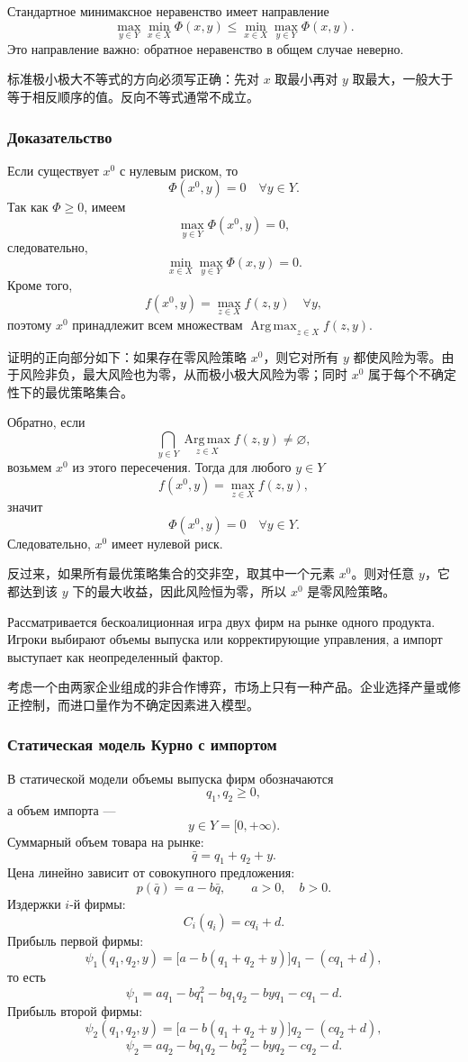 \documentclass[12pt,a4paper]{article}
\newcommand{\Argmax}{\operatorname*{Arg\,max}}
\newcommand{\zh}[1]{\par\noindent #1\par}
\begin{document}
Стандартное минимаксное неравенство имеет направление
\[
\max_{y\in Y}\min_{x\in X}\Phi(x,y)\le
\min_{x\in X}\max_{y\in Y}\Phi(x,y).
\]
Это направление важно: обратное неравенство в общем случае неверно.

\zh{标准极小极大不等式的方向必须写正确：先对 $x$ 取最小再对 $y$ 取最大，一般大于等于相反顺序的值。反向不等式通常不成立。}

\subsubsection{Доказательство}
Если существует $x^0$ с нулевым риском, то
\[
\Phi(x^0,y)=0\quad \forall y\in Y.
\]
Так как $\Phi\ge 0$, имеем
\[
\max_{y\in Y}\Phi(x^0,y)=0,
\]
следовательно,
\[
\min_{x\in X}\max_{y\in Y}\Phi(x,y)=0.
\]
Кроме того,
\[
f(x^0,y)=\max_{z\in X}f(z,y)\quad \forall y,
\]
поэтому $x^0$ принадлежит всем множествам $\Argmax_{z\in X}f(z,y)$.

\zh{证明的正向部分如下：如果存在零风险策略 $x^0$，则它对所有 $y$ 都使风险为零。由于风险非负，最大风险也为零，从而极小极大风险为零；同时 $x^0$ 属于每个不确定性下的最优策略集合。}

Обратно, если
\[
\bigcap_{y\in Y}\Argmax_{z\in X}f(z,y)\ne\varnothing,
\]
возьмем $x^0$ из этого пересечения. Тогда для любого $y\in Y$
\[
f(x^0,y)=\max_{z\in X}f(z,y),
\]
значит
\[
\Phi(x^0,y)=0\quad \forall y\in Y.
\]
Следовательно, $x^0$ имеет нулевой риск.

\zh{反过来，如果所有最优策略集合的交非空，取其中一个元素 $x^0$。则对任意 $y$，它都达到该 $y$ 下的最大收益，因此风险恒为零，所以 $x^0$ 是零风险策略。}

\newpage
{}


Рассматривается бескоалиционная игра двух фирм на рынке одного продукта. Игроки выбирают объемы выпуска или корректирующие управления, а импорт выступает как неопределенный фактор.

\zh{考虑一个由两家企业组成的非合作博弈，市场上只有一种产品。企业选择产量或修正控制，而进口量作为不确定因素进入模型。}

\subsubsection{Статическая модель Курно с импортом}
В статической модели объемы выпуска фирм обозначаются
\[
q_1,q_2\ge 0,
\]
а объем импорта ---
\[
y\in Y=[0,+\infty).
\]
Суммарный объем товара на рынке:
\[
\bar q=q_1+q_2+y.
\]
Цена линейно зависит от совокупного предложения:
\[
p(\bar q)=a-b\bar q,
\qquad a>0,\quad b>0.
\]
Издержки $i$-й фирмы:
\[
C_i(q_i)=cq_i+d.
\]
Прибыль первой фирмы:
\[
\psi_1(q_1,q_2,y)=\bigl[a-b(q_1+q_2+y)\bigr]q_1-(cq_1+d),
\]
то есть
\[
\psi_1=aq_1-bq_1^2-bq_1q_2-byq_1-cq_1-d.
\]
Прибыль второй фирмы:
\[
\psi_2(q_1,q_2,y)=\bigl[a-b(q_1+q_2+y)\bigr]q_2-(cq_2+d),
\]
\[
\psi_2=aq_2-bq_1q_2-bq_2^2-byq_2-cq_2-d.
\]
\end{document}
